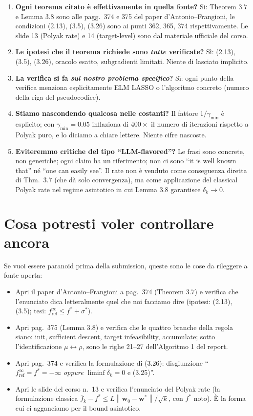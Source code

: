 \documentclass[11pt,a4paper]{article}
\newcommand{\norm}[1]{\left\|#1\right\|}
\newcommand{\bw}{\mathbf{w}}
\theoremstyle{definition}
\begin{document}
\begin{enumerate}[leftmargin=*]
\item \textbf{Ogni teorema citato è effettivamente in quella fonte?} Sì: Theorem 3.7 e Lemma 3.8 sono alle pagg.\ 374 e 375 del paper d'Antonio--Frangioni, le condizioni (2.13), (3.5), (3.26) sono ai punti 362, 365, 374 rispettivamente. Le slide 13 (Polyak rate) e 14 (target-level) sono dal materiale ufficiale del corso.
\item \textbf{Le ipotesi che il teorema richiede sono \emph{tutte} verificate?} Sì: (2.13), (3.5), (3.26), oracolo esatto, subgradienti limitati. Niente di lasciato implicito.
\item \textbf{La verifica si fa \emph{sul nostro problema specifico}?} Sì: ogni punto della verifica menziona esplicitamente ELM LASSO o l'algoritmo concreto (numero della riga del pseudocodice).
\item \textbf{Stiamo nascondendo qualcosa nelle costanti?} Il fattore $1/\gamma_{\min}$ è esplicito; con $\gamma_{\min}=0.05$ inflaziona di $400\times$ il numero di iterazioni rispetto a Polyak puro, e lo diciamo a chiare lettere. Niente cifre nascoste.
\item \textbf{Eviteremmo critiche del tipo ``LLM-flavored''?} Le frasi sono concrete, non generiche; ogni claim ha un riferimento; non ci sono ``it is well known that'' né ``one can easily see''. Il rate non è venduto come conseguenza diretta di Thm.\ 3.7 (che dà solo convergenza), ma come applicazione del classical Polyak rate nel regime asintotico in cui Lemma 3.8 garantisce $\delta_k\to 0$.
\end{enumerate}

\section{Cosa potresti voler controllare ancora}

Se vuoi essere paranoid prima della submission, queste sono le cose da rileggere a fonte aperta:

\begin{itemize}[leftmargin=*]
\item Apri il paper d'Antonio--Frangioni a pag.\ 374 (Theorem 3.7) e verifica che l'enunciato dica letteralmente quel che noi facciamo dire (ipotesi: (2.13), (3.5); tesi: $f^\infty_{\mathrm{ref}} \le f^* + \sigma^*$).
\item Apri pag.\ 375 (Lemma 3.8) e verifica che le quattro branche della regola siano: init, sufficient descent, target infeasibility, accumulate; sotto l'identificazione $\mu \leftrightarrow \rho$, sono le righe 21--27 dell'Algoritmo 1 del report.
\item Apri pag.\ 374 e verifica la formulazione di (3.26): disgiunzione ``$f^\infty_{\mathrm{ref}} = f^* = -\infty$ \emph{oppure} $\liminf \delta_k = 0$ e (3.25)''.
\item Apri le slide del corso n.~13 e verifica l'enunciato del Polyak rate (la formulazione classica $\bar f_k - f^* \le L\norm{\bw_0-\bw^*}/\sqrt k$, con $f^*$ noto). È la forma cui ci agganciamo per il bound asintotico.
\end{itemize}
\end{document}

